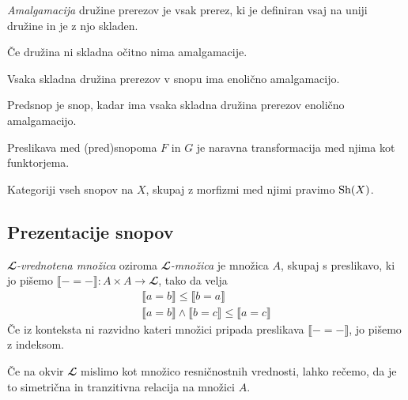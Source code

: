 \begin{definicija} %
  \emph{Amalgamacija} družine prerezov je vsak prerez, ki je definiran vsaj na
  uniji družine in je z njo skladen.
\end{definicija}

\begin{opomba}
  Če družina ni skladna očitno nima amalgamacije.
\end{opomba}
\begin{slogan}
  Vsaka skladna družina prerezov v snopu ima enolično amalgamacijo.
\end{slogan}
\begin{slogan}
  Predsnop je snop, kadar ima vsaka skladna družina prerezov enolično amalgamacijo.
\end{slogan}

\begin{definicija}
  Preslikava med (pred)snopoma \(F\) in \(G\) je naravna transformacija med
  njima kot funktorjema.
\end{definicija}

\begin{definicija}
  Kategoriji vseh snopov na \(X\), skupaj z morfizmi med njimi pravimo \(\textrm{Sh}{\left( X \right)}\).
\end{definicija}


\subsection{Prezentacije snopov}

\begin{definicija}
  \emph{\(𝓛\)-vrednotena množica} oziroma \emph{\(𝓛\)-množica} je množica \(A\),
  skupaj s preslikavo, ki jo pišemo \(⟦- = -⟧ : A×A → 𝓛\), tako da velja
  \begin{align*}
    ⟦ a = b ⟧ ≤ ⟦ b = a ⟧\\
    ⟦ a = b ⟧ ∧ ⟦ b = c ⟧ ≤ ⟦ a = c ⟧
  \end{align*}
  Če iz konteksta ni razvidno kateri množici pripada preslikava \(⟦- = -⟧\),
  jo pišemo z indeksom.
\end{definicija}

Če na okvir \(𝓛\) mislimo kot množico resničnostnih vrednosti, lahko rečemo, da je to simetrična in tranzitivna relacija na množici \(A\).

